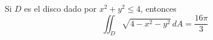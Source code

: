 \item Si $D$ es el disco dado por $x^2 + y^2 \le 4$, entonces
\[ \iint_D \sqrt{4 - x^2 - y^2} \, dA = \frac{16\pi}{3} \]
